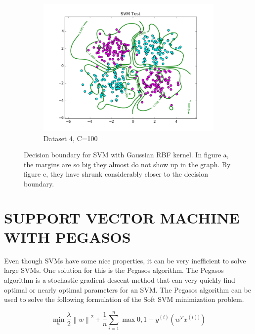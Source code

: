 \documentclass[10pt,twoside]{article}
\begin{document}
\begin{figure}[h]
\begin{subfigure}[b]{0.33\textwidth}
                \centering
                \includegraphics[width=\linewidth]{Figures/P2/RBF_data4_test_g1C100.png}
                \caption{Dataset 4, C=100}
        \end{subfigure}%
        \caption{Decision boundary for SVM with Gaussian RBF kernel. In figure a, the margins are so big they almost do not show up in the graph. By figure c, they have shrunk considerably closer to the decision boundary.}
\end{figure}



\section{\uppercase{Support Vector Machine with Pegasos}}

Even though SVMs have some nice properties, it can be very inefficient to solve large SVMs. One solution for this is the Pegasos algorithm. The Pegasos algorithm is a stochastic gradient descent method that can very quickly find optimal or nearly optimal parameters for an SVM. The Pegasos algorithm can be used to solve the following formulation of the Soft SVM minimization problem. 

\begin{equation}
\min_w \frac{\lambda}{2}\left \| w \right \|^2 + \frac{1}{n} \sum_{i=1}^n \max{0,1-y^{(i)}(w^Tx^{(i))})} 
\end{equation}
\end{document}
